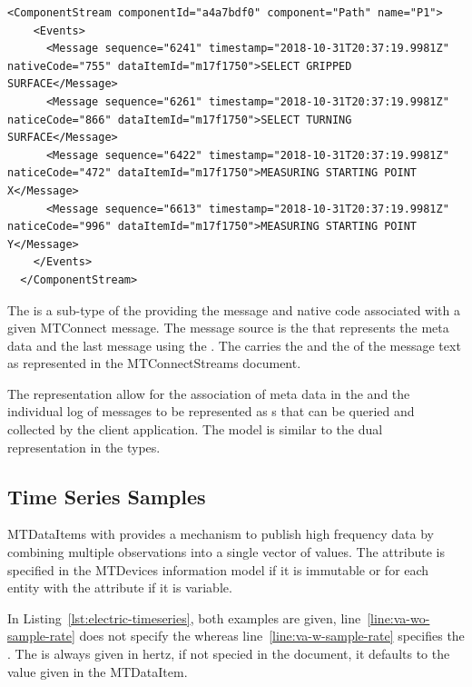 \begin{lstlisting}[firstnumber=last,escapechar=|,%
    caption={Path Motion Program Normal},label={lst:path-motion-program-condition-3}]
  <ComponentStream componentId="a4a7bdf0" component="Path" name="P1">
    <Events>
      <Message sequence="6241" timestamp="2018-10-31T20:37:19.9981Z" nativeCode="755" dataItemId="m17f1750">SELECT GRIPPED SURFACE</Message>
      <Message sequence="6261" timestamp="2018-10-31T20:37:19.9981Z" naticeCode="866" dataItemId="m17f1750">SELECT TURNING SURFACE</Message>
      <Message sequence="6422" timestamp="2018-10-31T20:37:19.9981Z" naticeCode="472" dataItemId="m17f1750">MEASURING STARTING POINT X</Message>
      <Message sequence="6613" timestamp="2018-10-31T20:37:19.9981Z" naticeCode="996" dataItemId="m17f1750">MEASURING STARTING POINT Y</Message>
    </Events>
  </ComponentStream>
\end{lstlisting}

The  is a sub-type of the  providing the message and native code associated with a given MTConnect message. The message source is the   that represents the meta data and the last message using the . The  carries the  and the  of the message text as represented in the MTConnectStreams document.

The representation allow for the association of meta data in the  and the individual log of messages to be represented as s that can be queried and collected by the client application. The model is similar to the dual representation in the  types.

\subsection{Time Series Samples}

\glspl{MTDataItem} with   provides a mechanism to publish high frequency data by combining multiple observations into a single vector of values. The attribute  is specified in the \glspl{MTDevice} information model if it is immutable or for each entity with the attribute  if it is variable. 

In Listing~\ref{lst:electric-timeseries}, both examples are given, line~\ref{line:va-wo-sample-rate} does not specify the  whereas line~\ref{line:va-w-sample-rate} specifies the . The  is always given in hertz, if not specied in the  document, it defaults to the value given in the \gls{MTDataItem}.

